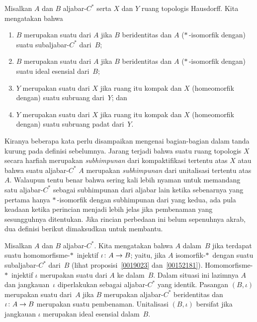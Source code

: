 \begin{defn}\label{0038614} Misalkan $A$ dan $B$ aljabar-$C^*$ serta $X$ dan $Y$
ruang topologis Hausdorff. Kita mengatakan bahwa
 \begin{enumerate}
    \item $B$ merupakan suatu  dari $A$ jika $B$ beridentitas dan $A$ ($*\,$-isomorfik
dengan) suatu subaljabar-$C^*$ dari~$B$;
    \item $B$ merupakan suatu  dari $A$ jika $B$ beridentitas dan $A$
($*\,$-isomorfik dengan) suatu ideal esensial dari~$B$;
    \item $Y$ merupakan suatu  dari $X$ jika ruang itu kompak dan $X$ (homeomorfik
dengan) suatu subruang dari~$Y$; dan
    \item $Y$ merupakan suatu  dari $X$ jika ruang itu kompak dan $X$
(homeomorfik dengan) suatu subruang padat dari~$Y$.
 \end{enumerate}
\end{defn}

Kiranya beberapa kata perlu disampaikan mengenai bagian-bagian dalam tanda kurung pada definisi
sebelumnya. Jarang terjadi bahwa suatu ruang topologis $X$ secara harfiah merupakan
\emph{subhimpunan} dari kompaktifikasi tertentu atas $X$ atau bahwa suatu aljabar-$C^*$ $A$ merupakan
\emph{subhimpunan} dari unitalisasi tertentu atas~$A$. Walaupun tentu benar bahwa sering kali
lebih nyaman untuk memandang satu aljabar-$C^*$ sebagai subhimpunan dari aljabar lain ketika sebenarnya yang
pertama hanya $*\,$-isomorfik dengan subhimpunan dari yang kedua, ada pula keadaan ketika
perincian menjadi lebih jelas jika pembenaman yang sesungguhnya ditentukan. Jika rincian perbedaan
ini belum sepenuhnya akrab, dua definisi berikut dimaksudkan untuk membantu.

\begin{defn} Misalkan $A$ dan $B$ aljabar-$C^*$. Kita mengatakan bahwa $A$
 dalam~$B$ jika terdapat suatu homomorfisme-$*\,$ injektif $\iota\colon A \rightarrow
B$; yaitu, jika $A$ isomorfik-$*\,$ dengan suatu subaljabar-$C^*$ dari~$B$ (lihat
proposisi~\ref{0019023} dan~\ref{00152181}). Homomorfisme-$*\,$ injektif $\iota$
merupakan suatu
 dari $A$ ke dalam~$B$. Dalam situasi ini lazimnya $A$ dan
jangkauan~$\iota$ diperlakukan sebagai aljabar-$C^*$ yang identik. Pasangan $(B,\iota)$ merupakan suatu
 dari~$A$ jika $B$ merupakan aljabar-$C^*$ beridentitas dan $\iota\colon A \rightarrow B$ merupakan suatu
pembenaman. Unitalisasi $(B,\iota)$ bersifat
 jika jangkauan $\iota$ merupakan ideal esensial dalam~$B$.
\end{defn}

